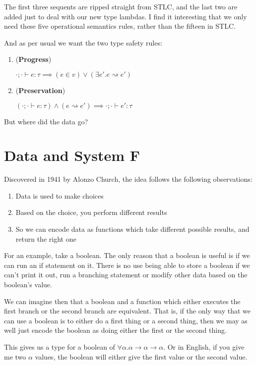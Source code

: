 \documentclass{article}
\begin{document}
The first three sequents are ripped straight from STLC, and the last two are added just to deal with our new type lambdas. I find it interesting that we only need these five operational semantics rules, rather than the fifteen in STLC.

And as per usual we want the two type safety rules:

\begin{enumerate}
\item (\textbf{Progress})

$\cdot  ; \cdot  \vdash e : \tau \implies (e \in v) \lor (\exists e'. e \rightsquigarrow e')$

\item (\textbf{Preservation})

$(\cdot  ; \cdot  \vdash e : \tau) \land (e \rightsquigarrow e') \implies \cdot  ; \cdot  \vdash e' : \tau$
\end{enumerate}

But where did the data go?

\newpage
\section{Data and System F}

Discovered in 1941 by Alonzo Church, the idea follows the following observations:

\begin{enumerate}
    \item Data is used to make choices
    \item Based on the choice, you perform different results
    \item So we can encode data as functions which take different possible results, and return the right one
\end{enumerate}

For an example, take a boolean. The only reason that a boolean is useful is if we can run an if statement on it. There is no use being able to store a boolean if we can't print it out, run a branching statement or modify other data based on the boolean's value.

We can imagine then that a boolean and a function which either executes the first branch or the second branch are equivalent. That is, if the only way that we can use a boolean is to either do a first thing or a second thing, then we may as well just encode the boolean as doing either the first or the second thing.

This gives us a type for a boolean of $\forall \alpha . \alpha  \to \alpha  \to \alpha $. Or in English, if you give me two $\alpha$ values, the boolean will either give the first value or the second value.
\end{document}
